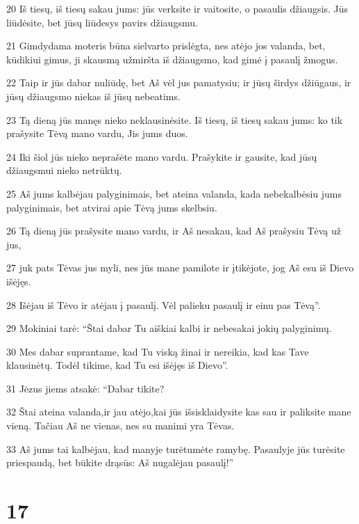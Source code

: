 \par 20 Iš tiesų, iš tiesų sakau jums: jūs verksite ir vaitosite, o pasaulis džiaugsis. Jūs liūdėsite, bet jūsų liūdesys pavirs džiaugsmu. 
\par 21 Gimdydama moteris būna sielvarto prislėgta, nes atėjo jos valanda, bet, kūdikiui gimus, ji skausmą užmiršta iš džiaugsmo, kad gimė į pasaulį žmogus. 
\par 22 Taip ir jūs dabar nuliūdę, bet Aš vėl jus pamatysiu; ir jūsų širdys džiūgaus, ir jūsų džiaugsmo niekas iš jūsų nebeatims. 
\par 23 Tą dieną jūs manęs nieko neklausinėsite. Iš tiesų, iš tiesų sakau jums: ko tik prašysite Tėvą mano vardu, Jis jums duos. 
\par 24 Iki šiol jūs nieko neprašėte mano vardu. Prašykite ir gausite, kad jūsų džiaugsmui nieko netrūktų. 
\par 25 Aš jums kalbėjau palyginimais, bet ateina valanda, kada nebekalbėsiu jums palyginimais, bet atvirai apie Tėvą jums skelbsiu. 
\par 26 Tą dieną jūs prašysite mano vardu, ir Aš nesakau, kad Aš prašysiu Tėvą už jus,­ 
\par 27 juk pats Tėvas jus myli, nes jūs mane pamilote ir įtikėjote, jog Aš esu iš Dievo išėjęs. 
\par 28 Išėjau iš Tėvo ir atėjau į pasaulį. Vėl palieku pasaulį ir einu pas Tėvą”. 
\par 29 Mokiniai tarė: “Štai dabar Tu aiškiai kalbi ir nebesakai jokių palyginimų. 
\par 30 Mes dabar suprantame, kad Tu viską žinai ir nereikia, kad kas Tave klausinėtų. Todėl tikime, kad Tu esi išėjęs iš Dievo”. 
\par 31 Jėzus jiems atsakė: “Dabar tikite? 
\par 32 Štai ateina valanda,­ir jau atėjo,­kai jūs išsisklaidysite kas sau ir paliksite mane vieną. Tačiau Aš ne vienas, nes su manimi yra Tėvas. 
\par 33 Aš jums tai kalbėjau, kad manyje turėtumėte ramybę. Pasaulyje jūs turėsite priespaudą, bet būkite drąsūs: Aš nugalėjau pasaulį!”


\chapter{17}


